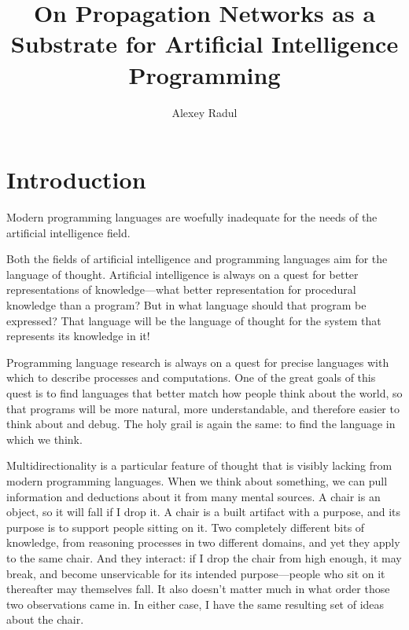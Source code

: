 \documentclass[12pt]{article}
\title{On Propagation Networks as a Substrate for Artificial Intelligence Programming}
\author{Alexey Radul}
\begin{document}
\maketitle

\section{Introduction}

Modern programming languages are woefully inadequate for the needs of
the artificial intelligence field.

Both the fields of artificial intelligence and programming languages
aim for the language of thought.  Artificial intelligence is always on
a quest for better representations of knowledge---what better
representation for procedural knowledge than a program?  But in what
language should that program be expressed?  That language will be the
language of thought for the system that represents its knowledge in
it!

Programming language research is always on a quest for precise
languages with which to describe processes and computations.  One of
the great goals of this quest is to find languages that better match
how people think about the world, so that programs will be more
natural, more understandable, and therefore easier to think about and
debug.  The holy grail is again the same: to find the language in
which we think.


Multidirectionality is a particular feature of thought that is visibly
lacking from modern programming languages.  When we think about
something, we can pull information and deductions about it from many
mental sources.  A chair is an object, so it will fall if I drop it.
A chair is a built artifact with a purpose, and its purpose is to
support people sitting on it.  Two completely different bits of
knowledge, from reasoning processes in two different domains, and yet
they apply to the same chair.  And they interact: if I drop the chair
from high enough, it may break, and become unservicable for its
intended purpose---people who sit on it thereafter may themselves
fall.  It also doesn't matter much in what order those two
observations came in.  In either case, I have the same resulting set
of ideas about the chair.
\end{document}
